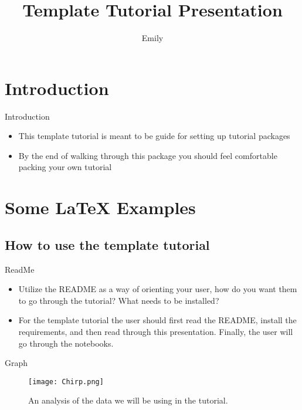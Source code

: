 \documentclass{beamer}
\title[Template Tutorial Presentation]{Template Tutorial Presentation}
\author{Emily}
\begin{document}
\begin{frame}
  \titlepage
\end{frame}


\section{Introduction}

\begin{frame}{Introduction}

\begin{itemize}
  \item This template tutorial is meant to be guide for setting up tutorial packages 
  \item By the end of walking through this package you should feel comfortable packing your own tutorial  
\end{itemize}


\end{frame}

\section{Some \LaTeX{} Examples}

\subsection{How to use the template tutorial}

\begin{frame}{ReadMe}

\begin{itemize}
  \item Utilize the README as a way of orienting your user, how do you want them to go through the tutorial? What needs to be installed?
  \item For the template tutorial the user should first read the README, install the requirements, and then read through this presentation. Finally, the user will go through the notebooks.
\end{itemize}

\end{frame}

\begin{frame}{Graph}

\begin{figure}
\texttt{[image: Chirp.png]} 
\caption{\label{fig:your-figure} An analysis of the data we will be using in the tutorial.}
\end{figure}

\end{frame}{}
\end{document}
